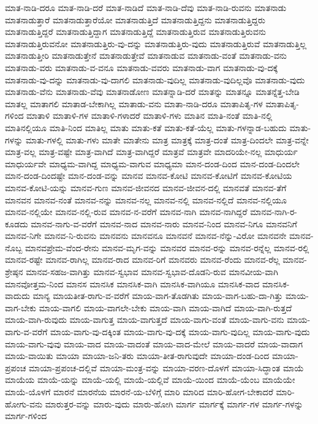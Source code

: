 {ಮಾತ-ನಾಡಿ-ದರೂ
ಮಾತ-ನಾಡಿ-ದರೆ
ಮಾತ-ನಾಡಿದೆ
ಮಾತ-ನಾಡಿ-ದೆವು
ಮಾತ-ನಾಡಿ-ರುವನು
ಮಾತನಾಡು
ಮಾತನಾಡುತ್ತಾರೆ
ಮಾತನಾಡುತ್ತಾರೆಯೋ
ಮಾತನಾಡುತ್ತಿದೆ
ಮಾತನಾಡುತ್ತಿದ್ದನು
ಮಾತನಾಡುತ್ತಿದ್ದರು
ಮಾತನಾಡುತ್ತಿದ್ದರೆ
ಮಾತನಾಡುತ್ತಿದ್ದಾಗ
ಮಾತನಾಡುತ್ತಿದ್ದೆ
ಮಾತನಾಡುತ್ತಿರುವ
ಮಾತನಾಡುತ್ತಿರುವನು
ಮಾತನಾಡುತ್ತಿರುವನೋ
ಮಾತನಾಡುತ್ತಿರು-ವು-ದನ್ನು
ಮಾತನಾಡುತ್ತಿರು-ವುದು
ಮಾತನಾಡುತ್ತಿರುವೆ
ಮಾತನಾಡುತ್ತಿಲ್ಲ
ಮಾತನಾಡುತ್ತೀರಿ
ಮಾತನಾಡುತ್ತೇನೆ
ಮಾತನಾಡುತ್ತೇವೆ
ಮಾತನಾಡುವ
ಮಾತನಾಡು-ವಂತೆ
ಮಾತನಾಡು-ವನು
ಮಾತನಾಡು-ವರು
ಮಾತನಾಡು-ವ-ವನೂ
ಮಾತನಾಡು-ವವರು
ಮಾತನಾಡು-ವಾಗ
ಮಾತನಾಡು-ವು-ದಕ್ಕೆ
ಮಾತನಾಡು-ವು-ದನ್ನು
ಮಾತನಾಡು-ವು-ದಾಗಲಿ
ಮಾತನಾಡು-ವುದಿಲ್ಲ
ಮಾತನಾಡು-ವುದಿಲ್ಲವೊ
ಮಾತನಾಡು-ವುದು
ಮಾತನಾಡು-ವೆನು
ಮಾತನಾಡು-ವೆವು
ಮಾತನಾಡೋಣ
ಮಾತನ್ನಾಡಿ-ದರೆ
ಮಾತನ್ನು
ಮಾತನ್ನೂ
ಮಾತನ್ನೆತ್ತ-ಬೇಡಿ
ಮಾತಲ್ಲ
ಮಾತಾಗಲಿ
ಮಾತಾಡ-ಬೇಕಾಗಿಲ್ಲ
ಮಾತಾಡು-ವನು
ಮಾತಾ-ನಾಡಿ-ದರೂ
ಮಾತಾಪಿತೃ-ಗಳ
ಮಾತಾಪಿತೃ-ಗಳಿಂದ
ಮಾತಾಳಿ
ಮಾತಾಳಿ-ಗಳ
ಮಾತಾಳಿ-ಗಳಾದರೆ
ಮಾತಾಳಿ-ಗಳು
ಮಾತಿನ
ಮಾತಿ-ನಂತೆ
ಮಾತಿ-ನಲ್ಲಿ
ಮಾತಿನಲ್ಲಿಯೂ
ಮಾತಿ-ನಿಂದ
ಮಾತಿಲ್ಲ
ಮಾತು
ಮಾತು-ಕತೆ
ಮಾತು-ಕತೆ-ಯೆಲ್ಲ
ಮಾತು-ಗಳನ್ನಾಡ-ಬಹುದು
ಮಾತು-ಗಳನ್ನು
ಮಾತು-ಗಳಲ್ಲಿ
ಮಾತು-ಗಳು
ಮಾತೇ
ಮಾತೇನು
ಮಾತ್ರ
ಮಾತ್ರಕ್ಕೆ
ಮಾತ್ರ-ದಂತೆ
ಮಾತ್ರ-ದಿಂದಲೇ
ಮಾತ್ರ-ವನ್ನೇ
ಮಾತ್ರ-ವಲ್ಲ
ಮಾತ್ರ-ವಷ್ಟೇ
ಮಾತ್ರ-ವಾಗಿದೆ
ಮಾತ್ರ-ವಾಗಿದ್ದರೆ
ಮಾತ್ರವೆ
ಮಾತ್ರವೇ
ಮಾದರಿಯೇ-ನಲ್ಲ
ಮಾಧುರ್ಯ
ಮಾಧುರ್ಯವೇ
ಮಾಧ್ಯಮ-ವಾಗಿದ್ದ
ಮಾಧ್ಯಮ-ವಾಗುವ
ಮಾಧ್ಯಮಾ
ಮಾನ-ದಂಡ-ದಿಂದ
ಮಾನ-ದಂಡ-ದಿಂದಲೇ
ಮಾನ-ದಂಡ-ದಿಂದಷ್ಟೇ
ಮಾನ-ದಂಡ-ವನ್ನು
ಮಾನವ
ಮಾನವ-ಕೋಟಿ
ಮಾನವ-ಕೋಟಿಗೆ
ಮಾನವ-ಕೋಟಿಯ
ಮಾನವ-ಕೋಟಿ-ಯನ್ನು
ಮಾನವ-ಗುಣ
ಮಾನವ-ಜೀವನದ
ಮಾನವ-ಜೀವನ-ದಲ್ಲಿ
ಮಾನವತೆ
ಮಾನವ-ತೆಗೆ
ಮಾನವನ
ಮಾನವ-ನಂತೆ
ಮಾನವ-ನನ್ನು
ಮಾನವ-ನಲ್ಲ
ಮಾನವ-ನಲ್ಲಿ
ಮಾನವ-ನಲ್ಲಿದೆ
ಮಾನವ-ನಲ್ಲಿಯೂ
ಮಾನವ-ನಲ್ಲಿಯೇ
ಮಾನವ-ನಲ್ಲಿ-ರುವ
ಮಾನವ-ನ-ವರೆಗೆ
ಮಾನವ-ನಾಗಿ
ಮಾನವ-ನಾಗಿದ್ದರೆ
ಮಾನವ-ನಾಗಿ-ರ-ಕೂಡದು
ಮಾನವ-ನಾಗು-ವ-ವರೆಗೆ
ಮಾನವ-ನಾದ
ಮಾನವ-ನಾರು
ಮಾನವ-ನಿಂದ
ಮಾನವ-ನಿಗೂ
ಮಾನವನಿಗೆ
ಮಾನವ-ನಿಗೇ
ಮಾನವ-ನಿ-ರುವನು
ಮಾನವನು
ಮಾನವನೂ
ಮಾನವನೆ
ಮಾನವ-ನೆನ್ನು-ವಿರೋ
ಮಾನವನೇ
ಮಾನವ-ನೊಬ್ಬ
ಮಾನವಪ್ರೇಮ-ವೆಂದ-ರೇನು
ಮಾನವ-ಮೃಗ-ವನ್ನು
ಮಾನವರ
ಮಾನವ-ರನ್ನು
ಮಾನವ-ರನ್ನೆಲ್ಲ
ಮಾನವ-ರಲ್ಲಿ
ಮಾನವ-ರಷ್ಟೇ
ಮಾನವ-ರಾಗಿಲ್ಲ
ಮಾನವ-ರಾದ
ಮಾನವ-ರಿಗೆ
ಮಾನವರು
ಮಾನವ-ರೆಂದು
ಮಾನವ-ರೆಲ್ಲ
ಮಾನವ-ಶ್ರೇಷ್ಠನ
ಮಾನವ-ಸಹಜ-ವಾಗಿತ್ತು
ಮಾನವ-ಸ್ವಭಾವ
ಮಾನವ-ಸ್ವಭಾವ-ದೊಡನಿ-ರುವ
ಮಾನವೀಯ-ವಾಗಿ
ಮಾನವೋತ್ತಮ-ನಿಂದ
ಮಾನಸ
ಮಾನಸಿಕ
ಮಾನಸಿಕ-ವಾಗಿ
ಮಾನಸಿಕ-ವಾಗಿಯೂ
ಮಾನಸಿಕ-ವಾದ
ಮಾನಸಿಕ-ವಾದುದು
ಮಾನ್ಯ
ಮಾಯತೀತ-ರಾಗು-ವ-ವರೆಗೆ
ಮಾಯ-ವಾಗ-ತೊಡಗಿತು
ಮಾಯ-ವಾಗ-ಬಹು-ದಾ-ಗಿತ್ತು
ಮಾಯ-ವಾಗ-ಬೇಕು
ಮಾಯ-ವಾಗಲಿ
ಮಾಯ-ವಾಗಲೇ-ಬೇಕು
ಮಾಯ-ವಾಗಿ
ಮಾಯ-ವಾಗಿದೆ
ಮಾಯ-ವಾಗಿ-ರುತ್ತದೆ
ಮಾಯ-ವಾಗಿ-ರುವುದು
ಮಾಯ-ವಾಗುತ್ತ
ಮಾಯ-ವಾಗುತ್ತದೆ
ಮಾಯ-ವಾಗು-ವಂತೆ
ಮಾಯ-ವಾಗು-ವನು
ಮಾಯ-ವಾಗು-ವ-ವರೆಗೆ
ಮಾಯ-ವಾಗು-ವು-ದಕ್ಕಿಂತ
ಮಾಯ-ವಾಗು-ವು-ದಕ್ಕೆ
ಮಾಯ-ವಾಗು-ವುದಿಲ್ಲ
ಮಾಯ-ವಾಗು-ವುದು
ಮಾಯ-ವಾಗು-ವುವು
ಮಾಯ-ವಾದ
ಮಾಯ-ವಾದಂತೆ
ಮಾಯ-ವಾದ-ಮೇಲೆ
ಮಾಯ-ವಾದರೆ
ಮಾಯ-ವಾದಾಗ
ಮಾಯ-ವಾಯಿತು
ಮಾಯಾ
ಮಾಯಾ-ಜನಿ-ತರು
ಮಾಯಾ-ತೀತ-ರಾಗುವುದೇ
ಮಾಯಾ-ದಂಡ-ದಿಂದ
ಮಾಯಾ-ಪ್ರಪಂಚ
ಮಾಯಾ-ಪ್ರಪಂಚ-ದಲ್ಲಿವೆ
ಮಾಯಾ-ಮಂತ್ರ-ವನ್ನು
ಮಾಯಾ-ವರಣ-ದೊಳಗೆ
ಮಾಯಾ-ಸಿದ್ಧಾಂತ
ಮಾಯೆ
ಮಾಯೆಯ
ಮಾಯೆ-ಯನ್ನು
ಮಾಯೆ-ಯಲ್ಲಿ
ಮಾಯೆ-ಯಲ್ಲಿವೆ
ಮಾಯೆ-ಯಿಂದ
ಮಾಯೆ-ಯೆಂಬ
ಮಾಯೆಯೇ
ಮಾಯೆ-ಯೊಳಗೆ
ಮಾರನೆ
ಮಾರನೆಯ
ಮಾರನೆ-ಯ-ಬೆಳಿಗ್ಗೆ
ಮಾರಿ
ಮಾರಿದ
ಮಾರಿ-ಹೋಗ-ಬೇಕಾದರೆ
ಮಾರಿ-ಹೋಗು-ವನು
ಮಾರುತ್ತರ-ವನ್ನು
ಮಾರು-ವುದು
ಮಾರು-ಹೋಗಿ
ಮಾರ್ಗ
ಮಾರ್ಗಕ್ಕೆ
ಮಾರ್ಗ-ಗಳ
ಮಾರ್ಗ-ಗಳನ್ನು
ಮಾರ್ಗ-ಗಳಿಂದ
}
